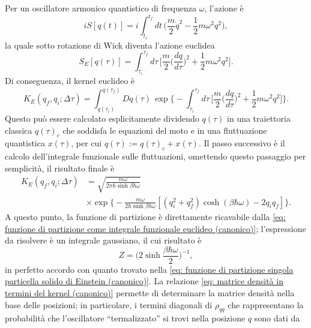 \begin{ex}
    Per un oscillatore armonico quantistico di frequenza $\omega$, l'azione è
    \begin{equation}
        iS[q(t)] = i\int_{t_i}^{t_f} dt\,\bigg(\frac{m}{2}\dot{q}^2 - \frac{1}{2}m\omega^2q^2\bigg),
    \end{equation}
    la quale sotto rotazione di Wick diventa l'azione euclidea
    \begin{equation}
        S_E[q(\tau)] = \int_{\tau_i}^{\tau_f}d\tau\,\bigg[\frac{m}{2}\bigg(\frac{dq}{d\tau}\bigg)^2 + \frac{1}{2}m\omega^2q^2\bigg].
    \end{equation}
    Di conseguenza, il kernel euclideo è
    \begin{equation}
        K_E(q_f,q_i;\Delta\tau) = \int_{q(\tau_i)}^{q(\tau_f)}Dq(\tau)\,\exp{\bigg\{-\int_{\tau_i}^{\tau_f}d\tau\,\bigg[\frac{m}{2}\bigg(\frac{dq}{d\tau}\bigg)^2 + \frac{1}{2}m\omega^2q^2\bigg]\bigg\}}.
    \end{equation}
    Questo può essere calcolato esplicitamente dividendo $q(\tau)$ in una traiettoria classica $q(\tau)_c$ che soddisfa le equazioni del moto e in una fluttuazione quantistica $x(\tau)$, per cui $q(\tau) := q(\tau)_c + x(\tau)$. Il passo successivo è il calcolo dell'integrale funzionale sulle fluttuazioni, omettendo questo passaggio per semplicità, il risultato finale è
    \begin{equation}
        \begin{split}
            K_E(q_f,q_i;\Delta\tau) &= \sqrt{\frac{m\omega}{2\pi\hbar\sinh{\beta\hbar\omega}}} \\
            &\times\exp{\bigg\{-\frac{m\omega}{2\hbar\sinh{\beta\hbar\omega}}[(q_i^2 + q_f^2)\cosh{(\beta\hbar\omega) - 2q_iq_f}]\bigg\}}.
        \end{split}
    \end{equation}
    A questo punto, la funzione di partizione è direttamente ricavabile dalla \eqref{eq: funzione di partizione come integrale funzionale euclideo (canonico)}; l'espressione da risolvere è un integrale gaussiano, il cui risultato è
    \begin{equation}
        Z = \bigg(2\sinh{\frac{\beta\hbar\omega}{2}}\bigg)^{-1},
    \end{equation}
    in perfetto accordo con quanto trovato nella \eqref{eq: funzione di partizione singola particella solido di Einstein (canonico)}. La relazione \eqref{eq: matrice densità in termini del kernel (canonico)} permette di determinare la matrice densità nella base delle posizioni; in particolare, i termini diagonali di $\rho_{qq}$ che rappresentano la probabilità che l'oscillatore ``termalizzato'' si trovi nella posizione $q$ sono dati da

\end{ex}
